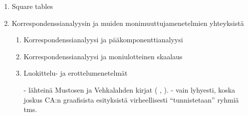 \begin{enumerate}
\item Square tables

\item Korrespondenssianalyysin ja muiden monimuuttujamenetelmien yhteyksistä

\begin{enumerate} %

\item Korrespondenssianalyysi ja pääkomponenttianalyysi
\item Korrespondenssianalyysi ja moniulotteinen skaalaus
\item Luokittelu- ja erottelumenetelmät

- lähteinä Mustosen ja Vehkalahden kirjat ( \cite{RefWorks:62}, \cite{RefWorks:76}).
- vain lyhyesti, koska joskus CA:n graafisista esityksistä virheellisesti ``tunnistetaan'' ryhmiä tms.

\end{enumerate} %

\end{enumerate} %




